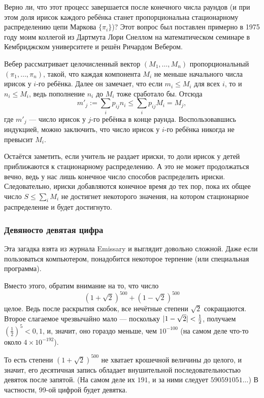 Верно ли, что этот процесс завершается после конечного числа раундов
(и при этом доля ирисок каждого ребёнка станет пропорциональна стационарному распределению цепи Маркова $\{\pi_i\}$)?
Этот вопрос был поставлен примерно в 1975 году моим коллегой из Дартмута Лори Снеллом на математическом семинаре в Кембриджском университете и решён Ричардом Вебером.

Вебер рассматривает целочисленный вектор $(M_1, \dots , M_n)$ пропорциональный $(\pi_1, \dots , \pi_n)$, такой, что каждая компонента $M_i$ не меньше начального числа ирисок у $i$-го ребёнка.
Далее он замечает, что если $m_i \leqslant M_i$ для всех $i$, то и $n_i \leqslant M_i$, ведь пополнение $n_i$ до $M_i$ тоже сработало бы.
Отсюда 
\[m'_j
:=
\sum_i p_{ij} n_i
\leqslant
\sum_i p_{ij} M_i
=
M_j,\] где $m'_j$ --- число ирисок у $j$-го ребёнка в конце раунда.
Воспользовавшись индукцией, можно заключить, что число ирисок у $i$-го ребёнка никогда не превысит $M_i$.

Остаётся заметить, если учитель не раздает ириски, то доли ирисок у детей приближаются к стационарному распределению.
А это не может продолжаться вечно, ведь у нас лишь конечное число способов распределить ириски.
Следовательно, ириски добавляются конечное время до тех пор, пока их общее число $S\leqslant\sum_iM_i$ не достигнет некоторого значения, на котором стационарное распределение и будет достигнуто.

\subsubsection*{Девяносто девятая цифра}

Эта загадка взята из журнала Emissary \cite[осень 1999]{3} и выглядит довольно сложной.
Даже если пользоваться компьютером, понадобится некоторое терпение (или специальная программа).

Вместо этого, обратим внимание на то, что число
\[(1+\sqrt{2})^{500}+(1-\sqrt{2})^{500}\]
целое.
Ведь после раскрытия скобок, все нечётные степени $\sqrt{2}$ сокращаются.
Второе слагаемое чрезвычайно мало --- поскольку $|1-\sqrt{2}|\z<\tfrac12$, получаем $(\tfrac12)^5<0{,}1$, и, значит, оно гораздо меньше, чем $10^{-100}$ (на самом деле что-то около $4 \times 10^{-192}$).

То есть степени $(1+\sqrt{2})^{500}$ не хватает крошечной величины до целого, и значит, его десятичная запись обладает внушительной последовательностью девяток после запятой.
(На самом деле их $191$, и за ними следует $590591051\dots$)
В частности, 99-ой цифрой будет девятка.

